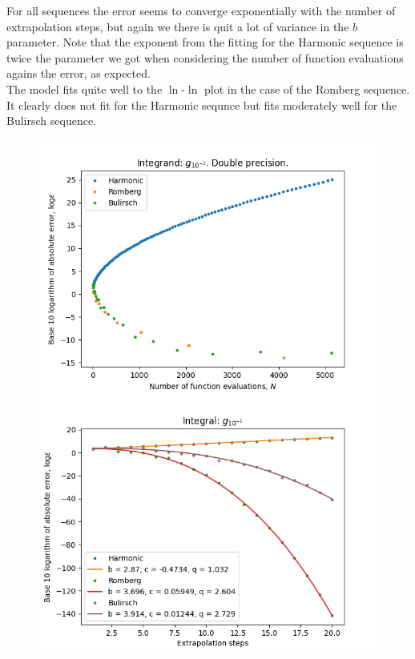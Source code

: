 For all sequences the error seems to converge exponentially with the number of extrapolation steps, but again we there is quit a lot of variance in the \(b\) parameter. Note that the exponent from the fitting for the Harmonic sequence is twice the parameter we got when considering the number of function evaluations agains the error, as expected.\\

The model fits quite well to the \(\ln\)-\(\ln\) plot in the case of the Romberg sequence. It clearly does not fit for the Harmonic sequnce but fits moderately well for the Bulirsch sequence.

\begin{figure}[H]
\centering
\begin{minipage}{0.45\textwidth}
\centering
\includegraphics[scale=0.45]{romberg_plots/g_tenth.png}
\end{minipage}
\begin{minipage}{0.45\textwidth}
\centering
\includegraphics[scale=0.45]{romberg_plots/g_tenth_hp_steps.png}
\end{minipage}
\end{figure}

